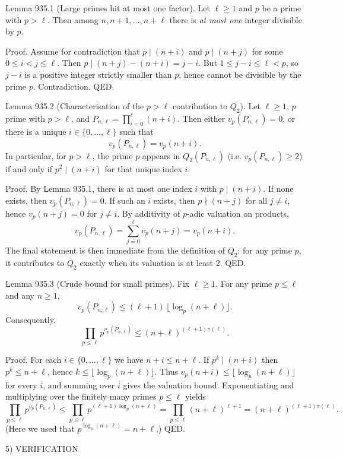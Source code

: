 Lemma 935.1 (Large primes hit at most one factor).
Let \(\ell\ge 1\) and \(p\) be a prime with \(p>\ell\). Then among \(n,n+1,\dots,n+\ell\) there is \emph{at most one} integer divisible by \(p\).

Proof.
Assume for contradiction that \(p\mid (n+i)\) and \(p\mid (n+j)\) for some \(0\le i<j\le \ell\). Then \(p\mid (n+j)-(n+i)=j-i\). But \(1\le j-i\le \ell<p\), so \(j-i\) is a positive integer strictly smaller than \(p\), hence cannot be divisible by the prime \(p\). Contradiction. QED.

Lemma 935.2 (Characterisation of the \(p>\ell\) contribution to \(Q_2\)).
Let \(\ell\ge 1\), \(p\) prime with \(p>\ell\), and \(P_{n,\ell}=\prod_{i=0}^{\ell}(n+i)\).
Then either \(v_p(P_{n,\ell})=0\), or there is a unique \(i\in\{0,\dots,\ell\}\) such that
\[v_p(P_{n,\ell})=v_p(n+i).\]
In particular, for \(p>\ell\), the prime \(p\) appears in \(Q_2(P_{n,\ell})\) (i.e. \(v_p(P_{n,\ell})\ge 2\)) if and only if \(p^2\mid (n+i)\) for that unique index \(i\).

Proof.
By Lemma 935.1, there is at most one index \(i\) with \(p\mid (n+i)\). If none exists, then \(v_p(P_{n,\ell})=0\). If such an \(i\) exists, then \(p\nmid (n+j)\) for all \(j\ne i\), hence \(v_p(n+j)=0\) for \(j\ne i\). By additivity of \(p\)-adic valuation on products,
\[v_p(P_{n,\ell})=\sum_{j=0}^{\ell} v_p(n+j)=v_p(n+i).\]
The final statement is then immediate from the definition of \(Q_2\): for any prime \(p\), it contributes to \(Q_2\) exactly when its valuation is at least \(2\). QED.

Lemma 935.3 (Crude bound for small primes).
Fix \(\ell\ge 1\). For any prime \(p\le \ell\) and any \(n\ge 1\),
\[v_p(P_{n,\ell}) \le (\ell+1)\,\Big\lfloor \log_p(n+\ell)\Big\rfloor.
\]
Consequently,
\[\prod_{p\le \ell} p^{v_p(P_{n,\ell})} \le (n+\ell)^{(\ell+1)\pi(\ell)}.
\]

Proof.
For each \(i\in\{0,\dots,\ell\}\) we have \(n+i\le n+\ell\). If \(p^{k}\mid (n+i)\) then \(p^{k}\le n+\ell\), hence \(k\le \lfloor \log_p(n+\ell)\rfloor\). Thus
\(v_p(n+i)\le \lfloor \log_p(n+\ell)\rfloor\) for every \(i\), and summing over \(i\) gives the valuation bound.
Exponentiating and multiplying over the finitely many primes \(p\le \ell\) yields
\[\prod_{p\le \ell} p^{v_p(P_{n,\ell})} \le \prod_{p\le \ell} p^{(\ell+1)\log_p(n+\ell)} = \prod_{p\le \ell} (n+\ell)^{\ell+1}=(n+\ell)^{(\ell+1)\pi(\ell)}.
\]
(Here we used that \(p^{\log_p(n+\ell)}=n+\ell\).) QED.

5) VERIFICATION

